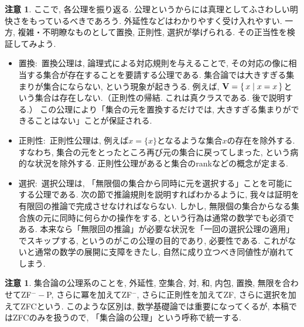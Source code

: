 \documentclass[a4paper, twoside]{bxjsarticle}
\theoremstyle{definition}
\newtheorem{rem}[thm]{注意}
\begin{document}
        \begin{rem}
        ここで, 各公理を振り返る. 公理というからには真理としてふさわしい明快さをもっているべきであろう. 外延性などはわかりやすく受け入れやすい. 一方, 複雑・不明瞭なものとして置換, 正則性, 選択が挙げられる. その正当性を検証してみよう.
        \begin{itemize}
            \item 置換$\colon$ 置換公理は, 論理式による対応規則を与えることで, その対応の像に相当する集合が存在することを要請する公理である. 集合論では大きすぎる集まりが集合にならない, という現象が起きうる. 例えば, $\textbf{V} = \set{x|x=x}$という集合は存在しない.（正則性の帰結. これは真クラスである. 後で説明する.） この公理により「集合の元を置換するだけでは, 大きすぎる集まりができることはない」ことが保証される. 
            
            \item 正則性$\colon$ 正則性公理は, 例えば$x=\{x\}$となるような集合$x$の存在を除外する. すなわち, 集合の元をとったところ再び元の集合に戻ってしまった, という病的な状況を除外する. 正則性公理があると集合のrankなどの概念が定まる.
            
            \item 選択$\colon$ 選択公理は, 「無限個の集合から同時に元を選択する」ことを可能にする公理である. 次の節で推論規則を説明すればわかるように, 我々は証明を有限回の推論で完成させなければならない. しかし, 無限個の集合からなる集合族の元に同時に何らかの操作をする, という行為は通常の数学でも必須である. 本来なら「無限回の推論」が必要な状況を「一回の選択公理の適用」でスキップする, というのがこの公理の目的であり, 必要性である. これがないと通常の数学の展開に支障をきたし, 自然に成り立つべき同値性が崩れてしまう. 
        \end{itemize}
        \end{rem}
        \begin{rem}
            集合論の公理系のことを, 外延性, 空集合, 対, 和, 内包, 置換, 無限を合わせてZF$^{-}-$P, さらに冪を加えてZF$^{-}$, さらに正則性を加えてZF, さらに選択を加えてZFCという. このような区別は, 数学基礎論では重要になってくるが, 本稿ではZFCのみを扱うので, 「集合論の公理」という呼称で統一する.
        \end{rem}
\end{document}
